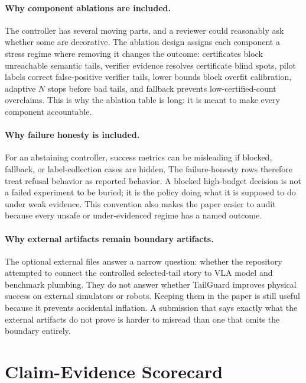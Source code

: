 \documentclass{article}
\begin{document}
\paragraph{Why component ablations are included.}
The controller has several moving parts, and a reviewer could reasonably ask whether some are decorative. The ablation design assigns each component a stress regime where removing it changes the outcome: certificates block unreachable semantic tails, verifier evidence resolves certificate blind spots, pilot labels correct false-positive verifier tails, lower bounds block overfit calibration, adaptive $N$ stops before bad tails, and fallback prevents low-certified-count overclaims. This is why the ablation table is long: it is meant to make every component accountable.

\paragraph{Why failure honesty is included.}
For an abstaining controller, success metrics can be misleading if blocked, fallback, or label-collection cases are hidden. The failure-honesty rows therefore treat refusal behavior as reported behavior. A blocked high-budget decision is not a failed experiment to be buried; it is the policy doing what it is supposed to do under weak evidence. This convention also makes the paper easier to audit because every unsafe or under-evidenced regime has a named outcome.

\paragraph{Why external artifacts remain boundary artifacts.}
The optional external files answer a narrow question: whether the repository attempted to connect the controlled selected-tail story to VLA model and benchmark plumbing. They do not answer whether TailGuard improves physical success on external simulators or robots. Keeping them in the paper is still useful because it prevents accidental inflation. A submission that says exactly what the external artifacts do not prove is harder to misread than one that omits the boundary entirely.

\section{Claim-Evidence Scorecard}
\label{app:claim-scorecard}


\end{document}
